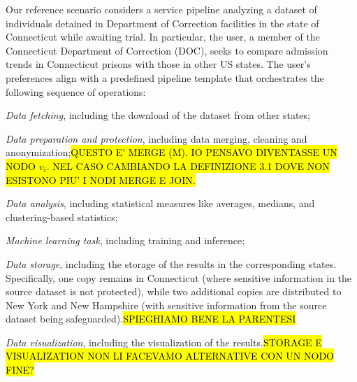Our reference scenario considers a service pipeline analyzing a dataset of individuals detained in Department of Correction facilities in the state of Connecticut while awaiting trial.
In particular, the user, a member of the Connecticut Department of Correction (DOC), seeks to compare admission trends in Connecticut prisons with those in other US states.
The user's preferences align with a predefined pipeline template that orchestrates the following sequence of operations:
\begin{enumerate*}[label=(\roman*)]
  \item \emph{Data fetching}, including the download of the dataset from other states;
  \item \emph{Data preparation and protection}, including data merging, cleaning and anonymization;\hl{QUESTO E' MERGE (M). IO PENSAVO DIVENTASSE UN NODO $v_i$. NEL CASO CAMBIANDO LA DEFINIZIONE 3.1 DOVE NON ESISTONO PIU' I NODI MERGE E JOIN.}
  \item \emph{Data analysis}, including statistical measures like averages, medians, and clustering-based statistics;
  \item \emph{Machine learning task}, including training and inference;
  \item \emph{Data storage}, including the storage of the results in the corresponding states. Specifically, one copy remains in Connecticut (where sensitive information in the source dataset is not protected), while two additional copies are distributed to New York and New Hampshire (with sensitive information from the source dataset being safeguarded).\hl{SPIEGHIAMO BENE LA PARENTESI}
  \item \emph{Data visualization}, including the visualization of the results.\hl{STORAGE E VISUALIZATION NON LI FACEVAMO ALTERNATIVE CON UN NODO FINE?}
\end{enumerate*}


